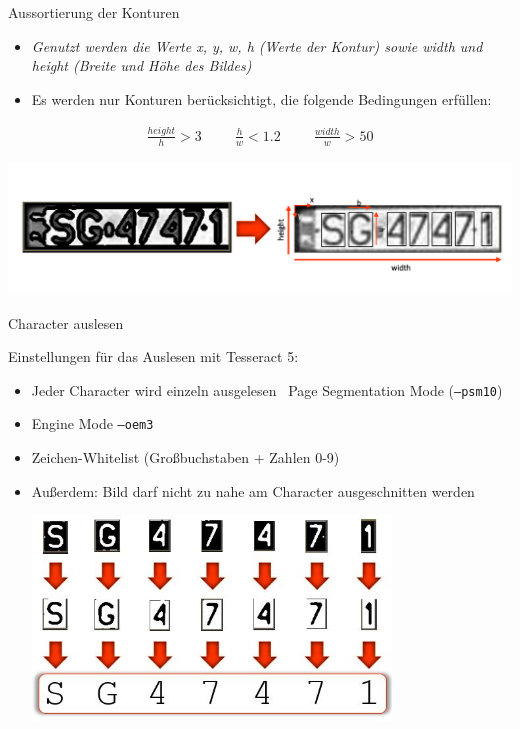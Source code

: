 \begin{frame}{Aussortierung der Konturen}
    \begin{itemize}
        \item {\textit{\scriptsize Genutzt werden die Werte x, y, w, h (Werte der Kontur) sowie width und height (Breite und Höhe des Bildes)}}
        \item {\scriptsize Es werden nur Konturen berücksichtigt, die folgende Bedingungen erf\"ullen:}
    \end{itemize}
    \begin{align*}
        \frac{height}{h} > 3
        \hspace{1cm}
        \frac{h}{w} < 1.2
        \hspace{1cm}
        \frac{width}{w} > 50
    \end{align*}
    \begin{center}
        \includegraphics[width=\textwidth]{img/contours}
    \end{center}
\end{frame}

\begin{frame}{Character auslesen}

    {\footnotesize Einstellungen für das Auslesen mit Tesseract 5:}
    \begin{itemize}
        \item {\scriptsize Jeder Character wird einzeln ausgelesen \rightarrow  \, Page Segmentation Mode (\texttt{--psm10})}
        \item {\scriptsize Engine Mode \texttt{--oem3}}
        \item {\scriptsize Zeichen-Whitelist (Großbuchstaben + Zahlen 0-9)}
        \item {\scriptsize Außerdem: Bild darf nicht zu nahe am Character ausgeschnitten werden}

              \begin{center}
                  \includegraphics[width=0.75\textwidth]{img/char_preprocessing.jpg}
              \end{center}

    \end{itemize}
\end{frame}


